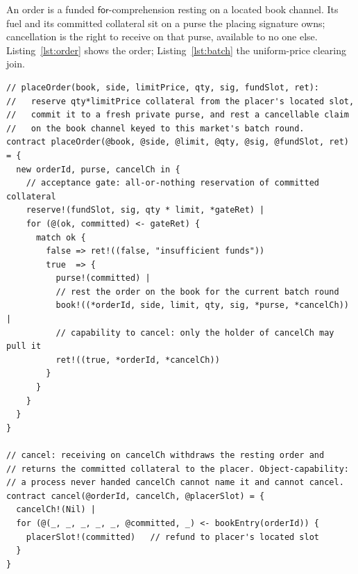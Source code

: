 \documentclass[11pt]{article}
\begin{document}
An order is a funded $\mathsf{for}$-comprehension resting on a located book channel. Its fuel
and its committed collateral sit on a purse the placing signature owns; cancellation is the
right to receive on that purse, available to no one else. Listing~\ref{lst:order} shows the
order; Listing~\ref{lst:batch} the uniform-price clearing join.

\begin{lstlisting}[caption={A resting order: collateral and fuel committed to a located slot;
cancellable only by the placing signature.},label={lst:order}]
// placeOrder(book, side, limitPrice, qty, sig, fundSlot, ret):
//   reserve qty*limitPrice collateral from the placer's located slot,
//   commit it to a fresh private purse, and rest a cancellable claim
//   on the book channel keyed to this market's batch round.
contract placeOrder(@book, @side, @limit, @qty, @sig, @fundSlot, ret) = {
  new orderId, purse, cancelCh in {
    // acceptance gate: all-or-nothing reservation of committed collateral
    reserve!(fundSlot, sig, qty * limit, *gateRet) |
    for (@(ok, committed) <- gateRet) {
      match ok {
        false => ret!((false, "insufficient funds"))
        true  => {
          purse!(committed) |
          // rest the order on the book for the current batch round
          book!((*orderId, side, limit, qty, sig, *purse, *cancelCh)) |
          // capability to cancel: only the holder of cancelCh may pull it
          ret!((true, *orderId, *cancelCh))
        }
      }
    }
  }
}

// cancel: receiving on cancelCh withdraws the resting order and
// returns the committed collateral to the placer. Object-capability:
// a process never handed cancelCh cannot name it and cannot cancel.
contract cancel(@orderId, cancelCh, @placerSlot) = {
  cancelCh!(Nil) |
  for (@(_, _, _, _, _, @committed, _) <- bookEntry(orderId)) {
    placerSlot!(committed)   // refund to placer's located slot
  }
}
\end{lstlisting}
\end{document}
